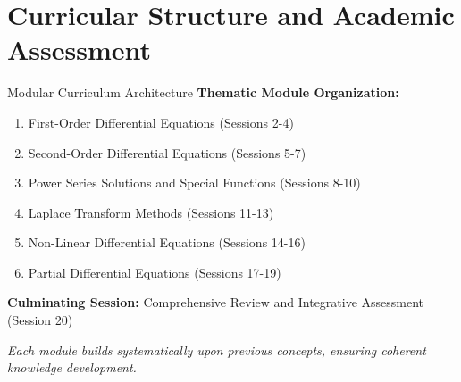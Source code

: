 \documentclass[10pt,aspectratio=169]{beamer}
\newcommand{\concept}[1]{\textbf{#1}}
\newcommand{\emphasis}[1]{\textit{#1}}
\begin{document}
\section{Curricular Structure and Academic Assessment}

\begin{frame}{Modular Curriculum Architecture}
    \concept{Thematic Module Organization:}
    
    \vspace{0.3cm}
    
    \begin{enumerate}
        \item First-Order Differential Equations (Sessions 2-4)
        \item Second-Order Differential Equations (Sessions 5-7)
        \item Power Series Solutions and Special Functions (Sessions 8-10)
        \item Laplace Transform Methods (Sessions 11-13)
        \item Non-Linear Differential Equations (Sessions 14-16)
        \item Partial Differential Equations (Sessions 17-19)
    \end{enumerate}
    
    \vspace{0.3cm}
    
    \concept{Culminating Session:} Comprehensive Review and Integrative Assessment (Session 20)
    
    \vspace{0.2cm}
    
    \emphasis{Each module builds systematically upon previous concepts, ensuring coherent knowledge development.}
\end{frame}
\end{document}
